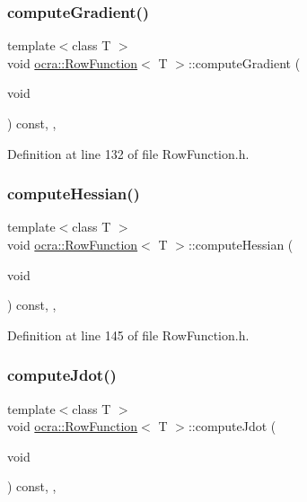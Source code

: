 \subsubsection{\texorpdfstring{compute\+Gradient()}{computeGradient()}}
{\footnotesize\ttfamily template$<$class T $>$ \\
void \hyperlink{classocra_1_1RowFunction}{ocra\+::\+Row\+Function}$<$ T $>$\+::compute\+Gradient (\begin{DoxyParamCaption}\item[{void}]{ }\end{DoxyParamCaption}) const\hspace{0.3cm}{\ttfamily [inline]}, {\ttfamily [protected]}, {\ttfamily [virtual]}}



Definition at line 132 of file Row\+Function.\+h.

\hypertarget{classocra_1_1RowFunction_ab9d6a1f29d2a3756700e2200d402b4fb}{}\label{classocra_1_1RowFunction_ab9d6a1f29d2a3756700e2200d402b4fb} 
\subsubsection{\texorpdfstring{compute\+Hessian()}{computeHessian()}}
{\footnotesize\ttfamily template$<$class T $>$ \\
void \hyperlink{classocra_1_1RowFunction}{ocra\+::\+Row\+Function}$<$ T $>$\+::compute\+Hessian (\begin{DoxyParamCaption}\item[{void}]{ }\end{DoxyParamCaption}) const\hspace{0.3cm}{\ttfamily [inline]}, {\ttfamily [protected]}, {\ttfamily [virtual]}}



Definition at line 145 of file Row\+Function.\+h.

\hypertarget{classocra_1_1RowFunction_a1ec66fcc1c35b323c38f3798f2439172}{}\label{classocra_1_1RowFunction_a1ec66fcc1c35b323c38f3798f2439172} 
\subsubsection{\texorpdfstring{compute\+Jdot()}{computeJdot()}}
{\footnotesize\ttfamily template$<$class T $>$ \\
void \hyperlink{classocra_1_1RowFunction}{ocra\+::\+Row\+Function}$<$ T $>$\+::compute\+Jdot (\begin{DoxyParamCaption}\item[{void}]{ }\end{DoxyParamCaption}) const\hspace{0.3cm}{\ttfamily [inline]}, {\ttfamily [protected]}, {\ttfamily [virtual]}}



